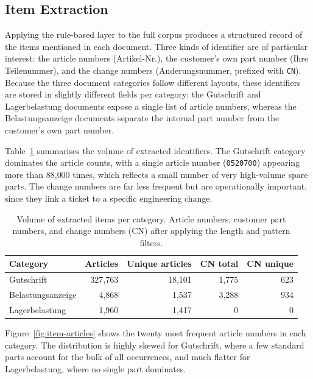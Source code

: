 \subsection{Item Extraction}
\label{subsec:item-extraction}
%
Applying the rule-based layer to the full corpus produces a structured record of
the items mentioned in each document.  Three kinds of identifier are of
particular interest: the article numbers (Artikel-Nr.), the customer's own part
number (Ihre Teilenummer), and the change numbers (Anderungsnummer, prefixed
with \texttt{CN}).  Because the three document categories follow different
layouts, these identifiers are stored in slightly different fields per category:
the Gutschrift and Lagerbelastung documents expose a single list of article
numbers, whereas the Belastungsanzeige documents separate the internal part
number from the customer's own part number.

Table~\ref{tab:item-extraction} summarises the volume of extracted identifiers.
The Gutschrift category dominates the article counts, with a single article
number (\texttt{0520700}) appearing more than 88{,}000 times, which reflects a
small number of very high-volume spare parts.  The change numbers are far less
frequent but are operationally important, since they link a ticket to a specific
engineering change.

\begin{table}[H]
    \centering
    \caption[Volume of extracted items per category]{Volume of extracted items per category. Article numbers, customer part numbers, and change numbers (CN) after applying the length and pattern filters.}
    \label{tab:item-extraction}
    \begin{tabular}{lrrrr}
        \hline
        \textbf{Category} & \textbf{Articles} & \textbf{Unique articles} & \textbf{CN total} & \textbf{CN unique} \\
        \hline
        Gutschrift        & 327{,}763 & 18{,}101 & 1{,}775 & 623 \\
        Belastungsanzeige &   4{,}868 &  1{,}537 & 3{,}288 & 934 \\
        Lagerbelastung    &   1{,}960 &  1{,}417 &       0 &   0 \\
        \hline
    \end{tabular}
\end{table}

Figure~\ref{fig:item-articles} shows the twenty most frequent article numbers in
each category.  The distribution is highly skewed for Gutschrift, where a few
standard parts account for the bulk of all occurrences, and much flatter for
Lagerbelastung, where no single part dominates.

